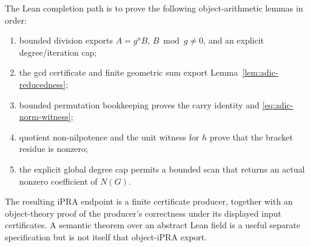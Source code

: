 The Lean completion path is to prove the following object-arithmetic
lemmas in order:
\begin{enumerate}
\item bounded division exports \(A=g^aB\), \(B\bmod g\ne0\),
      and an explicit degree/iteration cap;
\item the gcd certificate and finite geometric sum export
      Lemma~\ref{lem:adic-reducedness};
\item bounded permutation bookkeeping proves the carry identity and
      \eqref{eq:adic-norm-witness};
\item quotient non-nilpotence and the unit witness for \(h\) prove that
      the bracket residue is nonzero;
\item the explicit global degree cap permits a bounded scan that returns
      an actual nonzero coefficient of \(N(G)\).
\end{enumerate}
The resulting iPRA endpoint is a finite certificate producer, together with
an object-theory proof of the producer's correctness under its displayed
input certificates.  A semantic theorem over an abstract Lean field is a
useful separate specification but is not itself that object-iPRA export.

